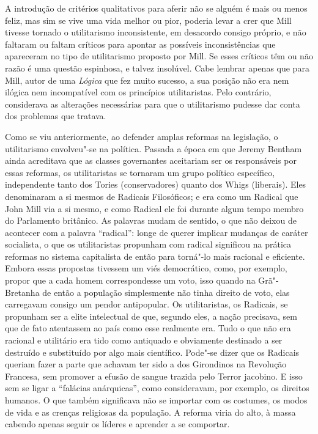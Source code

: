 A introdução de critérios qualitativos para aferir não se alguém é mais
ou menos feliz, mas sim se vive uma vida melhor ou pior, poderia levar
a crer que Mill tivesse tornado o utilitarismo inconsistente, em
desacordo consigo próprio, e não faltaram ou faltam críticos para
apontar as possíveis inconsistências que apareceram no tipo de
utilitarismo proposto por Mill. Se esses críticos têm ou não razão é
uma questão espinhosa, e talvez insolúvel. Cabe lembrar apenas que
para Mill, autor de uma \textit{Lógica} que fez muito sucesso, a sua
posição não era nem ilógica nem incompatível com os princípios
utilitaristas. Pelo contrário, considerava as alterações necessárias
para que o utilitarismo pudesse dar conta dos problemas que tratava. 

Como se viu anteriormente, ao defender amplas reformas na legislação, o
utilitarismo envolveu"-se na política. Passada a época em que Jeremy
Bentham ainda acreditava que as classes governantes aceitariam ser os
responsáveis por essas reformas, os utilitaristas se tornaram um grupo
político específico, independente tanto dos Tories (conservadores)
quanto dos Whigs (liberais). Eles denominaram a si mesmos de Radicais
Filosóficos; e era como um Radical que John Mill via a si mesmo, e como
Radical ele foi durante algum tempo membro do Parlamento britânico. As
palavras mudam de sentido, o que não deixou de acontecer com a palavra
``radical'': longe de querer implicar mudanças de caráter socialista, o
que os utilitaristas propunham com radical significou na prática
reformas no sistema capitalista de então para torná"-lo mais racional
e eficiente. Embora essas propostas tivessem um viés democrático, como, 
por exemplo, propor que a cada homem correspondesse um voto, isso
quando na Grã"-Bretanha de então a população simplesmente não tinha
direito de voto, elas carregavam consigo um pendor antipopular. Os
utilitaristas, os Radicais, se propunham ser a elite intelectual de que,
segundo eles, a nação precisava, sem que de fato atentassem ao país
como esse realmente era. Tudo o que não era racional e utilitário era
tido como antiquado e obviamente destinado a ser destruído e
substituído por algo mais científico. Pode"-se dizer que os Radicais
queriam fazer a parte que achavam ter sido a dos Girondinos na
Revolução Francesa, sem promover a efusão de sangue trazida pelo Terror
jacobino. E isso sem se ligar a ``falácias anárquicas'', como
consideravam, por exemplo, os direitos humanos. O que também
significava não se importar com os costumes, os modos de vida e as
crenças religiosas da população. A reforma viria do alto, à massa
cabendo apenas seguir os líderes e aprender a se comportar. 

